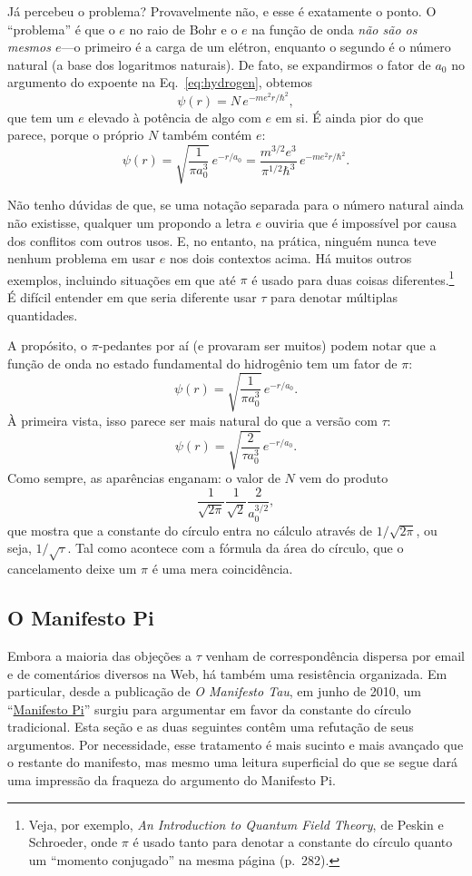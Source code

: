 {Já percebeu o problema? Provavelmente não, e esse é exatamente o ponto. O ``problema'' é que o $e$ no raio de Bohr e o $e$ na função de onda \emph{não são os mesmos $e$}---o primeiro é a carga de um elétron, enquanto o segundo é o número natural (a base dos logaritmos naturais). De fato, se expandirmos o fator de $a_0$ no argumento do expoente na Eq.~\eqref{eq:hydrogen}, obtemos
\[
\psi(r) = N\,e^{-m e^2 r/\hbar^2},
\]
que tem um $e$ elevado à potência de algo com $e$ em si. É ainda pior do que parece, porque o próprio $N$ também contém $e$:
\[
\psi(r) = \sqrt{\frac{1}{\pi a_0^3}}\,e^{-r/a_0} =
\frac{m^{3/2} e^3}{\pi^{1/2} \hbar^3}\,e^{-m e^2 r/\hbar^2}.
\]

Não tenho dúvidas de que, se uma notação separada para o número natural ainda não existisse, qualquer um propondo a letra $e$ ouviria que é impossível por causa dos conflitos com outros usos. E, no entanto, na prática, ninguém nunca teve nenhum problema em usar $e$ nos dois contextos acima.
Há muitos outros exemplos, incluindo situações em que até $\pi$ é usado para duas coisas diferentes.\footnote{Veja, por exemplo, \emph{An Introduction to Quantum Field Theory}, de Peskin e Schroeder, onde $\pi$ é usado tanto para denotar a constante do círculo quanto um ``momento conjugado'' na mesma página (p.~282).} É difícil entender em que seria diferente usar $\tau$ para denotar múltiplas quantidades.

A propósito, o $\pi$-pedantes por aí (e provaram ser muitos) podem notar que a função de onda no estado fundamental do hidrogênio tem um fator de $\pi$:
\[
\psi(r) = \sqrt{\frac{1}{\pi a_0^3}}\,e^{-r/a_0}.
\]
À primeira vista, isso parece ser mais natural do que a versão com $\tau$:
\[
\psi(r) = \sqrt{\frac{2}{\tau a_0^3}}\,e^{-r/a_0}.
\]
Como sempre, as aparências enganam: o valor de $N$ vem do produto
\[
\frac{1}{\sqrt{2\pi}} \frac{1}{\sqrt{2}} \frac{2}{a_0^{3/2}},
\]
que mostra que a constante do círculo entra no cálculo através de $1/\sqrt{2\pi}$, ou seja, $1/\sqrt{\tau}$. Tal como acontece com a fórmula da área do círculo, que o cancelamento deixe um $\pi$  é uma mera coincidência.


  \subsection{O Manifesto Pi} %
  \label{sec:the_pi_manifesto_a_rebuttal}

Embora a maioria das objeções a $\tau$ venham de correspondência dispersa por email e de comentários diversos na Web, há também uma resistência organizada. Em particular, desde a publicação de \emph{O Manifesto Tau}, em junho de 2010, um ``\href{http://www.thepimanifesto.com/}{Manifesto Pi}'' surgiu para argumentar em favor da constante do círculo tradicional. Esta seção e as duas seguintes contêm uma refutação de seus argumentos. Por necessidade, esse tratamento é mais sucinto e mais avançado que o restante do manifesto, mas mesmo uma leitura superficial do que se segue dará uma impressão da fraqueza do argumento do Manifesto Pi.

}
